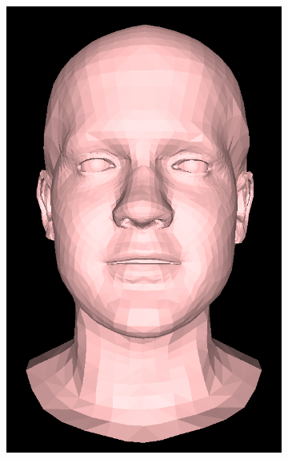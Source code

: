 \begin{figure}[h!]
\begin{subfigure}[b]{0.19\textwidth}
        \includegraphics[width=\textwidth]{figures/gen_sample/00019.png}
    \end{subfigure}
    \begin{subfigure}[b]{0.19\textwidth}

\end{subfigure}
\end{figure}
